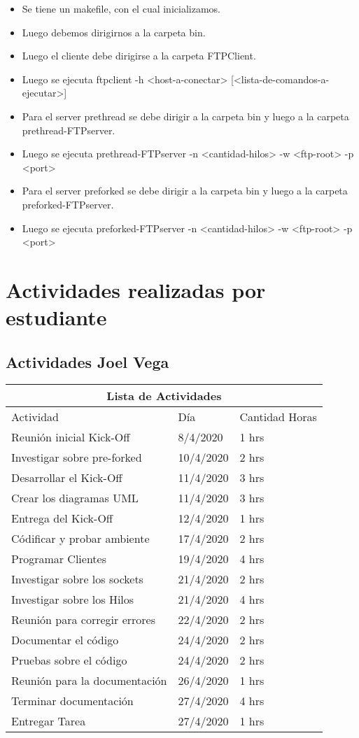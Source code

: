 \documentclass[a4paper,12pt,twoside]{article}
\begin{document}
\begin{itemize}
    \item Se tiene un makefile, con el cual inicializamos. 
    \item Luego debemos dirigirnos a la carpeta bin. 
    \item Luego el cliente debe dirigirse a la carpeta FTPClient.
    \item Luego se ejecuta ftpclient -h <host-a-conectar> [<lista-de-comandos-a-ejecutar>]
    \item Para el server prethread se debe dirigir a la carpeta bin y luego a la carpeta prethread-FTPserver.
    \item Luego se ejecuta prethread-FTPserver -n <cantidad-hilos> -w <ftp-root> -p <port>
    \item Para el server preforked se debe dirigir a la carpeta bin y luego a la carpeta preforked-FTPserver.
    \item Luego se ejecuta preforked-FTPserver -n <cantidad-hilos> -w <ftp-root> -p <port>
\end{itemize}


\newpage
\section{Actividades realizadas por estudiante}

\subsection{Actividades Joel Vega}
\begin{tabular}{ |p{7cm}||p{3cm}|p{3cm}|  }
 \hline
 \multicolumn{3}{|c|}{Lista de Actividades} \\
 \hline
 Actividad        & Día   &Cantidad Horas\\
 \hline
Reunión inicial Kick-Off   &8/4/2020     &1 hrs\\
Investigar sobre pre-forked   &10/4/2020     &2 hrs\\
Desarrollar el Kick-Off   &11/4/2020     &3 hrs\\
Crear los diagramas UML   &11/4/2020     &3 hrs\\
Entrega del Kick-Off    &12/4/2020     &1 hrs\\
 \hline
 Códificar y probar ambiente   &17/4/2020     &2 hrs\\
 Programar Clientes   &19/4/2020     &4 hrs\\
 Investigar sobre los sockets   &21/4/2020     &2 hrs\\
 Investigar sobre los Hilos   &21/4/2020     &4 hrs\\
 Reunión para corregir errores    &22/4/2020     &2 hrs\\
 Documentar el código    &24/4/2020     &2 hrs\\
 Pruebas sobre el código   &24/4/2020     &2 hrs\\
 Reunión para la documentación   &26/4/2020     &1 hrs\\
 Terminar documentación   &27/4/2020     &4 hrs\\
 Entregar Tarea   &27/4/2020     &1 hrs\\
 \hline
\end{tabular}
\end{document}
